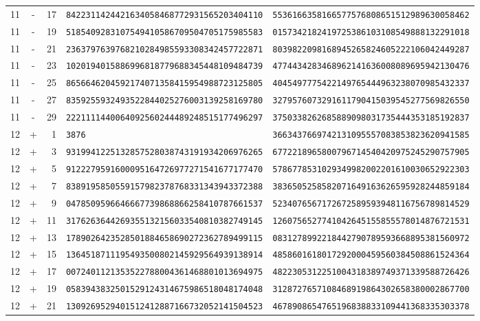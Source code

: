 \begin{longtable}{@{}rcrll@{}}
11&-&17&\texttt{8422311424421634058468772931565203404110}&\texttt{5536166358166577576808651512989630058462}\\
11&-&19&\texttt{5185409283107549410586709504705175985583}&\texttt{0157342182419725386103108549888132291018}\\
11&-&21&\texttt{2363797639768210284985593308342457722871}&\texttt{8039822098168945265824605222106042449287}\\
11&-&23&\texttt{1020194015886996818779688345448109484739}&\texttt{4774434283468962141636008089695942130476}\\
11&-&25&\texttt{8656646204592174071358415954988723125805}&\texttt{4045497775422149765444963238070985432337}\\
11&-&27&\texttt{8359255932493522844025276003139258169780}&\texttt{3279576073291611790415039545277569826550}\\
11&-&29&\texttt{2221111440064092560244489248515177496297}&\texttt{3750338262685889098031735444353185192837}\\
12&+&1&\texttt{3876}&\texttt{3663437669742131095557083853823620941585}\\
12&+&3&\texttt{9319941225132857528038743191934206976265}&\texttt{6772218965800796714540420975245290757905}\\
12&+&5&\texttt{9122279591600095164726977271541677177470}&\texttt{5786778531029349982002201610030652922303}\\
12&+&7&\texttt{8389195850559157982378768331343943372388}&\texttt{3836505258582071649163626595928244859184}\\
12&+&9&\texttt{0478509596646667739868866258410787661537}&\texttt{5234076567172672589593948116756789814529}\\
12&+&11&\texttt{3176263644269355132156033540810382749145}&\texttt{1260756527741042645155855578014876721531}\\
12&+&13&\texttt{1789026423528501884658690272362789499115}&\texttt{0831278992218442790789593668895381560972}\\
12&+&15&\texttt{1364518711195493500802145929564939138914}&\texttt{4858601618017292000459560384508861524364}\\
12&+&17&\texttt{0072401121353522788004361468801013694975}&\texttt{4822305312251004318389749371339588726426}\\
12&+&19&\texttt{0583943832501529124314675986518048174048}&\texttt{3128727657108468919864302658380002867700}\\
12&+&21&\texttt{1309269529401512412887166732052141504523}&\texttt{4678908654765196838833109441368335303378}\\

\end{longtable}
